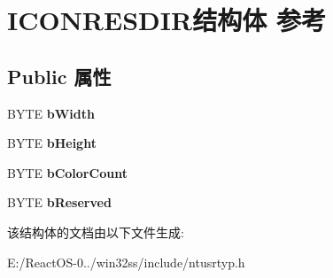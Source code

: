 \hypertarget{struct_i_c_o_n_r_e_s_d_i_r}{}\section{I\+C\+O\+N\+R\+E\+S\+D\+I\+R结构体 参考}
\label{struct_i_c_o_n_r_e_s_d_i_r}
\subsection*{Public 属性}
\begin{DoxyCompactItemize}
\item 
\mbox{\label{struct_i_c_o_n_r_e_s_d_i_r_a90940732cebda6783bb2d0a1fa1c570c}} 
B\+Y\+TE {\bfseries b\+Width}
\item 
\mbox{\label{struct_i_c_o_n_r_e_s_d_i_r_a802d7d4c824e2c00d739b866d23edb3f}} 
B\+Y\+TE {\bfseries b\+Height}
\item 
\mbox{\label{struct_i_c_o_n_r_e_s_d_i_r_a7a918a3b084b3c11d5a31b3d15c7821b}} 
B\+Y\+TE {\bfseries b\+Color\+Count}
\item 
\mbox{\label{struct_i_c_o_n_r_e_s_d_i_r_a70aa1fa72bd3844fd008f4db20d2e24a}} 
B\+Y\+TE {\bfseries b\+Reserved}
\end{DoxyCompactItemize}


该结构体的文档由以下文件生成\+:\begin{DoxyCompactItemize}
\item 
E\+:/\+React\+O\+S-\/0../win32ss/include/ntusrtyp.\+h\end{DoxyCompactItemize}
